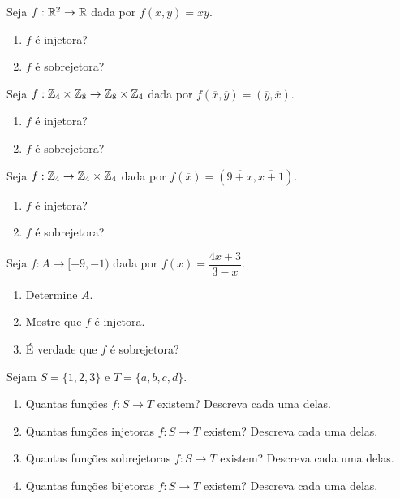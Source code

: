 \documentclass[12pt]{exam}
\begin{document}
\vspace{.6cm}

\questao{} Seja $f: \mathbb{R}^2 \to \mathbb{R}$ dada por $f(x,y) = xy$.
\begin{enumerate}[label={\alph*})]
    \item $f$ é injetora?

    \item $f$ é sobrejetora?
\end{enumerate}

\vspace{.3cm}

\questao{} Seja $f: \mathbb{Z}_4 \times \mathbb{Z}_8 \to \mathbb{Z}_8 \times \mathbb{Z}_4$ dada por $f(\overline{x},\overline{y}) = (\overline{y}, \overline{x})$.
\begin{enumerate}[label={\alph*})]
    \item $f$ é injetora?

    \item $f$ é sobrejetora?
\end{enumerate}

\vspace{.3cm}

\questao{} Seja $f: \mathbb{Z}_4 \to \mathbb{Z}_4 \times \mathbb{Z}_4$ dada por $f(\overline{x}) = (\overline{9 + x},\overline{x+1})$.
\begin{enumerate}[label={\alph*})]
    \item $f$ é injetora?

    \item $f$ é sobrejetora?
\end{enumerate}

\vspace{.3cm}

\questao{} Seja $f : A \to [-9,-1)$ dada por $f(x) = \dfrac{4x + 3}{3 - x}$.
\begin{enumerate}[label={\alph*})]
    \item Determine $A$.

    \item Mostre que $f$ é injetora.

    \item É verdade que $f$ é sobrejetora?
\end{enumerate}

\vspace{.3cm}

\questao{} Sejam $S = \{1, 2, 3\}$ e $T = \{a, b, c, d\}$.
\begin{enumerate}[label={\alph*})]
    \item Quantas funções $f : S \to T$ existem? Descreva cada uma delas.

    \item Quantas funções injetoras $f : S \to T$ existem? Descreva cada uma delas.

    \item Quantas funções sobrejetoras $f : S \to T$ existem? Descreva cada uma delas.

    \item Quantas funções bijetoras $f : S \to T$ existem? Descreva cada uma delas.
\end{enumerate}
\end{document}
